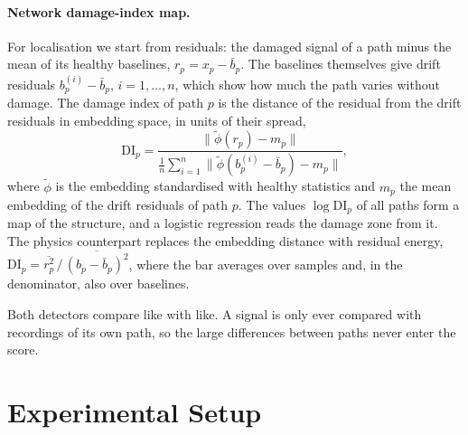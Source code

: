 \documentclass{article}
\begin{document}
\paragraph{Network damage-index map.}
For localisation we start from residuals: the damaged signal of a path minus the mean of its healthy
baselines, $r_p = x_p - \bar b_p$. The baselines themselves give drift residuals
$b^{(i)}_p-\bar b_p$, $i=1,\dots,n$, which show how much the path varies without damage. The damage index
of path $p$ is the distance of the residual from the drift residuals in embedding space, in units of
their spread,
\begin{equation}
  \mathrm{DI}_p = \frac{\lVert \tilde\phi(r_p) - m_p\rVert}
  {\frac{1}{n}\sum_{i=1}^{n}\lVert\tilde\phi(b^{(i)}_p-\bar b_p) - m_p\rVert},
  \label{eq:di}
\end{equation}
where $\tilde\phi$ is the embedding standardised with healthy statistics and $m_p$ the mean embedding of
the drift residuals of path $p$. The values $\log\mathrm{DI}_p$ of all paths form a map of the structure,
and a logistic regression reads the damage zone from it. The physics counterpart replaces the embedding
distance with residual energy, $\mathrm{DI}_p=\overline{r_p^2}\,/\,\overline{(b_p-\bar b_p)^2}$, where the
bar averages over samples and, in the denominator, also over baselines.

Both detectors compare like with like. A signal is only ever compared with recordings of its own path,
so the large differences between paths never enter the score.

\section{Experimental Setup}
\label{sec:setup}
\end{document}
